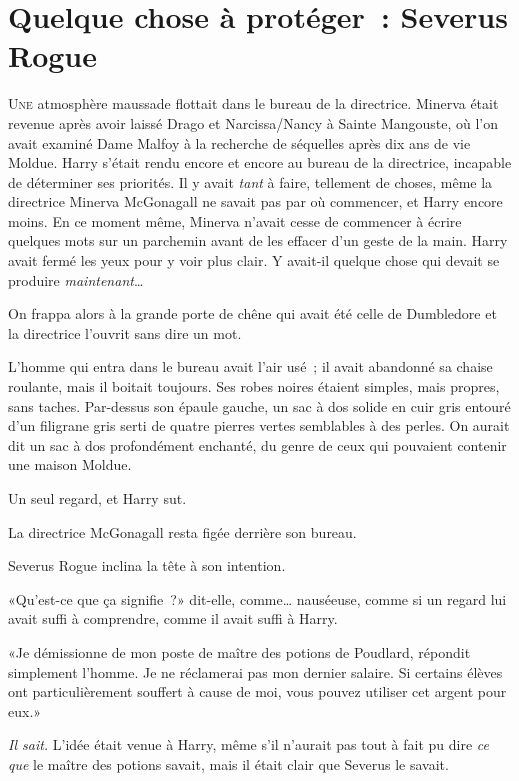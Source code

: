 \chapter{Quelque chose à protéger~: Severus Rogue}

\lettrine{U}{ne} atmosphère maussade flottait dans le bureau de la directrice. Minerva était revenue après avoir laissé Drago et Narcissa/Nancy à Sainte Mangouste, où l'on avait examiné Dame Malfoy à la recherche de séquelles après dix ans de vie Moldue. Harry s'était rendu encore et encore au bureau de la directrice, incapable de déterminer ses priorités. Il y avait \emph{tant} à faire, tellement de choses, même la directrice Minerva McGonagall ne savait pas par où commencer, et Harry encore moins. En ce moment même, Minerva n'avait cesse de commencer à écrire quelques mots sur un parchemin avant de les effacer d'un geste de la main. Harry avait fermé les yeux pour y voir plus clair. Y avait-il quelque chose qui devait se produire \emph{maintenant}…

On frappa alors à la grande porte de chêne qui avait été celle de Dumbledore et la directrice l'ouvrit sans dire un mot.

L'homme qui entra dans le bureau avait l'air usé~; il avait abandonné sa chaise roulante, mais il boitait toujours. Ses robes noires étaient simples, mais propres, sans taches. Par-dessus son épaule gauche, un sac à dos solide en cuir gris entouré d'un filigrane gris serti de quatre pierres vertes semblables à des perles. On aurait dit un sac à dos profondément enchanté, du genre de ceux qui pouvaient contenir une maison Moldue.

Un seul regard, et Harry sut.

La directrice McGonagall resta figée derrière son bureau.

Severus Rogue inclina la tête à son intention.

«Qu'est-ce que ça signifie~?» dit-elle, comme… nauséeuse, comme si un regard lui avait suffi à comprendre, comme il avait suffi à Harry.

«Je démissionne de mon poste de maître des potions de Poudlard, répondit simplement l'homme. Je ne réclamerai pas mon dernier salaire. Si certains élèves ont particulièrement souffert à cause de moi, vous pouvez utiliser cet argent pour eux.»

\emph{Il sait.} L'idée était venue à Harry, même s'il n'aurait pas tout à fait pu dire \emph{ce que} le maître des potions savait, mais il était clair que Severus le savait.

